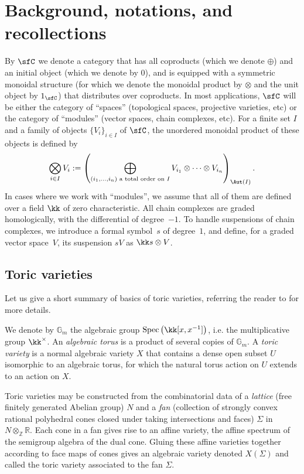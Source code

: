 \section{Background, notations, and recollections}\label{sec:recollections}

By $\sfC$ we denote a category that has all coproducts (which we denote $\oplus$) and an initial object (which we denote by $0$), and is equipped with a symmetric monoidal structure (for which we denote the monoidal product by $\otimes$ and the unit object by $1_{\sfC}$) that distributes over coproducts. In most applications, $\sfC$ will be either the category of ``spaces'' (topological spaces, projective varieties, etc) or the category of ``modules'' (vector spaces, chain complexes, etc). For a finite set $I$ and a family of objects $\{V_i\}_{i\in I}$ of $\sfC$, the unordered monoidal product of these objects is defined by 
 \[
\bigotimes_{i\in I} V_i:=\left(\bigoplus_{(i_1,\ldots,i_n) \text{ a total order on } I} V_{i_1}\otimes\cdots\otimes V_{i_n}\right)_{\Aut(I)}.
 \]
In cases where we work with ``modules'', we assume that all of them are defined over a field $\kk$ of zero characteristic. All chain complexes are graded homologically, with the differential of degree~$-1$. To handle suspensions of chain complexes, we introduce a formal symbol~$s$ of degree~$1$, and define, for a graded vector space~$V$, its suspension $sV$ as $\kk s\otimes V$.

\subsection{Toric varieties}

Let us give a short summary of basics of toric varieties, referring the reader to \cite{MR495499,MR1234037} for more details.

We denote by $\mathbb{G}_m$ the algebraic group $\mathop{\mathrm{Spec}}\left(\kk[x,x^{-1}]\right)$, i.e. the multiplicative group $\kk^\times$.
An \emph{algebraic torus} is a product of several copies of $\mathbb{G}_m$. A \emph{toric variety} is a normal algebraic variety $X$ that contains a dense open subset $U$ isomorphic to an algebraic torus, for which the natural torus action on $U$ extends to an action on $X$. 

Toric varieties may be constructed from the combinatorial data of a \emph{lattice} (free finitely generated Abelian group) $N$ and a \emph{fan} (collection of strongly convex rational polyhedral cones closed under taking intersections and faces) $\Sigma$ in $N\otimes_{\mathbb{Z}}\mathbb{R}$. Each cone in a fan gives rise to an affine variety, the affine spectrum of the semigroup algebra of the dual cone. Gluing these affine varieties together according to face maps of cones gives an algebraic variety denoted $X(\Sigma)$ and called the toric variety associated to the fan $\Sigma$. 
    
